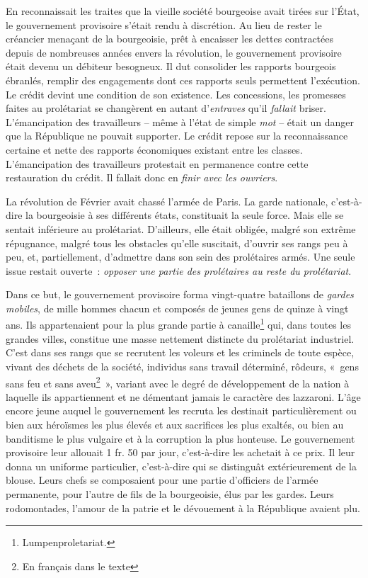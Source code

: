 \documentclass[french,twoside]{book} %
\begin{document}
En reconnaissait les traites que la vieille société bourgeoise avait tirées sur l’État, le gouvernement provisoire s’était rendu à discrétion. Au lieu de rester le créancier menaçant de la bourgeoisie, prêt à encaisser les dettes contractées depuis de nombreuses années envers la révolution, le gouvernement provisoire était devenu un débiteur besogneux. Il dut consolider les rapports bourgeois ébranlés, remplir des engagements dont ces rapports seuls permettent l’exécution. Le crédit devint une condition de son existence. Les concessions, les promesses faites au prolétariat se changèrent en autant d’\emph{entraves} qu’il \emph{fallait} briser. L’émancipation des travailleurs – même à l’état de simple \emph{mot} – était un danger que la République ne pouvait supporter. Le crédit repose sur la reconnaissance certaine et nette des rapports économiques existant entre les classes. L’émancipation des travailleurs protestait en permanence contre cette restauration du crédit. Il fallait donc en \emph{finir avec les ouvriers}.\par
La révolution de Février avait chassé l’armée de Paris. La garde nationale, c’est-à-dire la bourgeoisie à ses différents états, constituait la seule force. Mais elle se sentait inférieure au prolétariat. D’ailleurs, elle était obligée, malgré son extrême répugnance, malgré tous les obstacles qu’elle suscitait, d’ouvrir ses rangs peu à peu, et, partiellement, d’admettre dans son sein des prolétaires armés. Une seule issue restait ouverte : \emph{opposer une partie des prolétaires au reste du prolétariat}.\par
Dans ce but, le gouvernement provisoire forma vingt-quatre bataillons de \emph{gardes mobiles}, de mille hommes chacun et composés de jeunes gens de quinze à vingt ans. Ils appartenaient pour la plus grande partie à canaille\footnote{Lumpenproletariat.} qui, dans toutes les grandes villes, constitue une masse nettement distincte du prolétariat industriel. C’est dans ses rangs que se recrutent les voleurs et les criminels de toute espèce, vivant des déchets de la société, individus sans travail déterminé, rôdeurs, « gens sans feu et sans aveu\footnote{En français dans le texte} », variant avec le degré de développement de la nation à laquelle ils appartiennent et ne démentant jamais le caractère des lazzaroni. L’âge encore jeune auquel le gouvernement les recruta les destinait particulièrement ou bien aux héroïsmes les plus élevés et aux sacrifices les plus exaltés, ou bien au banditisme le plus vulgaire et à la corruption la plus honteuse. Le gouvernement provisoire leur allouait 1 fr. 50 par jour, c’est-à-dire les achetait à ce prix. Il leur donna un uniforme particulier, c’est-à-dire qui se distinguât extérieurement de la blouse. Leurs chefs se composaient pour une partie d’officiers de l’armée permanente, pour l’autre de fils de la bourgeoisie, élus par les gardes. Leurs rodomontades, l’amour de la patrie et le dévouement à la République avaient plu.\par
\end{document}
